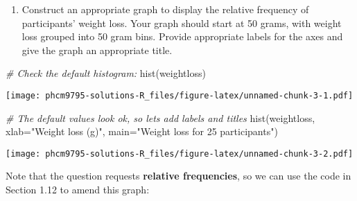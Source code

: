\documentclass[
]{memoir}
\newenvironment{Shaded}{\begin{snugshade}}{\end{snugshade}}
\newcommand{\AttributeTok}[1]{\textcolor[rgb]{0.77,0.63,0.00}{#1}}
\newcommand{\CommentTok}[1]{\textcolor[rgb]{0.56,0.35,0.01}{\textit{#1}}}
\newcommand{\ConstantTok}[1]{\textcolor[rgb]{0.00,0.00,0.00}{#1}}
\newcommand{\DecValTok}[1]{\textcolor[rgb]{0.00,0.00,0.81}{#1}}
\newcommand{\FunctionTok}[1]{\textcolor[rgb]{0.00,0.00,0.00}{#1}}
\newcommand{\NormalTok}[1]{#1}
\newcommand{\OtherTok}[1]{\textcolor[rgb]{0.56,0.35,0.01}{#1}}
\newcommand{\SpecialCharTok}[1]{\textcolor[rgb]{0.00,0.00,0.00}{#1}}
\newcommand{\StringTok}[1]{\textcolor[rgb]{0.31,0.60,0.02}{#1}}
\providecommand{\tightlist}{%
  \setlength{\itemsep}{0pt}\setlength{\parskip}{0pt}}
\begin{document}
\begin{enumerate}
\def\labelenumi{\alph{enumi})}
\setcounter{enumi}{2}
\tightlist
\item
  Construct an appropriate graph to display the relative frequency of participants' weight loss. Your graph should start at 50 grams, with weight loss grouped into 50 gram bins. Provide appropriate labels for the axes and give the graph an appropriate title.
\end{enumerate}

\begin{Shaded}
\begin{Highlighting}[]
\CommentTok{\# Check the default histogram:}
\FunctionTok{hist}\NormalTok{(weightloss)}
\end{Highlighting}
\end{Shaded}

\texttt{[image: phcm9795-solutions-R\_files/figure-latex/unnamed-chunk-3-1.pdf]}

\begin{Shaded}
\begin{Highlighting}[]
\CommentTok{\# The default values look ok, so let\textquotesingle{}s add labels and titles}
\FunctionTok{hist}\NormalTok{(weightloss, }\AttributeTok{xlab=}\StringTok{"Weight loss (g)"}\NormalTok{, }\AttributeTok{main=}\StringTok{"Weight loss for 25 participants"}\NormalTok{)}
\end{Highlighting}
\end{Shaded}

\texttt{[image: phcm9795-solutions-R\_files/figure-latex/unnamed-chunk-3-2.pdf]}

Note that the question requests \textbf{relative frequencies}, so we can use the code in Section 1.12 to amend this graph:

\begin{Shaded}
\end{Shaded}
\end{document}
